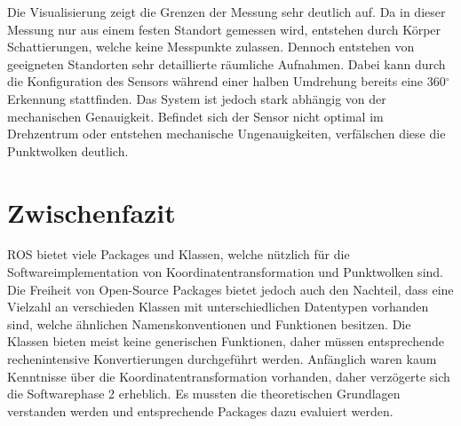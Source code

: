 Die Visualisierung zeigt die Grenzen der Messung sehr deutlich auf. Da in dieser Messung nur aus einem festen Standort gemessen wird, entstehen durch Körper Schattierungen, welche keine Messpunkte zulassen. Dennoch entstehen von geeigneten Standorten sehr detaillierte räumliche Aufnahmen. Dabei kann durch die Konfiguration des Sensors während einer halben Umdrehung bereits eine 360$^\circ$ Erkennung stattfinden. Das System ist jedoch stark abhängig von der mechanischen Genauigkeit. Befindet sich der Sensor nicht optimal im Drehzentrum oder entstehen mechanische Ungenauigkeiten, verfälschen diese die Punktwolken deutlich.

\section{Zwischenfazit}
\label{sec:ZwischenfazitReal}
ROS bietet viele Packages und Klassen, welche nützlich für die Softwareimplementation von Koordinatentransformation und Punktwolken sind. Die Freiheit von Open-Source Packages bietet jedoch auch den Nachteil, dass eine Vielzahl an verschieden Klassen mit unterschiedlichen Datentypen vorhanden sind, welche ähnlichen Namenskonventionen und Funktionen besitzen. Die Klassen bieten meist keine generischen Funktionen, daher müssen entsprechende rechenintensive Konvertierungen durchgeführt werden. Anfänglich waren kaum Kenntnisse über die Koordinatentransformation vorhanden, daher verzögerte sich die Softwarephase 2 erheblich. Es mussten die theoretischen Grundlagen verstanden werden und entsprechende Packages dazu evaluiert werden.


